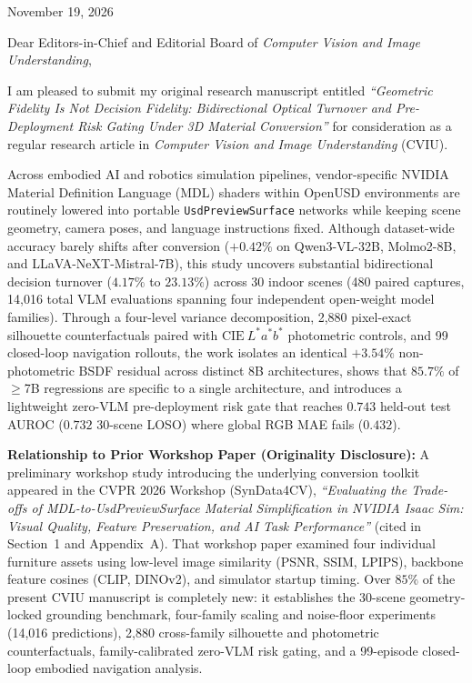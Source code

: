 \documentclass[11pt,a4paper]{article}
\begin{document}
November 19, 2026

Dear Editors-in-Chief and Editorial Board of \textit{Computer Vision and Image Understanding},

I am pleased to submit my original research manuscript entitled \textit{``Geometric Fidelity Is Not Decision Fidelity: Bidirectional Optical Turnover and Pre-Deployment Risk Gating Under 3D Material Conversion''} for consideration as a regular research article in \textit{Computer Vision and Image Understanding} (CVIU).

Across embodied AI and robotics simulation pipelines, vendor-specific NVIDIA Material Definition Language (\textsc{MDL}) shaders within OpenUSD environments are routinely lowered into portable \texttt{UsdPreviewSurface} networks while keeping scene geometry, camera poses, and language instructions fixed. Although dataset-wide accuracy barely shifts after conversion ($+0.42\%$ on Qwen3-VL-32B, Molmo2-8B, and LLaVA-NeXT-Mistral-7B), this study uncovers substantial bidirectional decision turnover ($4.17\%$ to $23.13\%$) across 30 indoor scenes (480 paired captures, 14,016 total VLM evaluations spanning four independent open-weight model families). Through a four-level variance decomposition, 2,880 pixel-exact silhouette counterfactuals paired with $\mathrm{CIE}~L^*a^*b^*$ photometric controls, and 99 closed-loop navigation rollouts, the work isolates an identical $+3.54\%$ non-photometric BSDF residual across distinct 8B architectures, shows that $85.7\%$ of $\ge$7B regressions are specific to a single architecture, and introduces a lightweight zero-VLM pre-deployment risk gate that reaches $0.743$ held-out test AUROC ($0.732$ 30-scene LOSO) where global RGB MAE fails ($0.432$).

\textbf{Relationship to Prior Workshop Paper (Originality Disclosure):} A preliminary workshop study introducing the underlying conversion toolkit appeared in the CVPR 2026 Workshop (SynData4CV), \textit{``Evaluating the Trade-offs of MDL-to-UsdPreviewSurface Material Simplification in NVIDIA Isaac Sim: Visual Quality, Feature Preservation, and AI Task Performance''} (cited in Section~1 and Appendix~A). That workshop paper examined four individual furniture assets using low-level image similarity (PSNR, SSIM, LPIPS), backbone feature cosines (CLIP, DINOv2), and simulator startup timing. Over $85\%$ of the present CVIU manuscript is completely new: it establishes the 30-scene geometry-locked grounding benchmark, four-family scaling and noise-floor experiments (14,016 predictions), 2,880 cross-family silhouette and photometric counterfactuals, family-calibrated zero-VLM risk gating, and a 99-episode closed-loop embodied navigation analysis.
\end{document}
